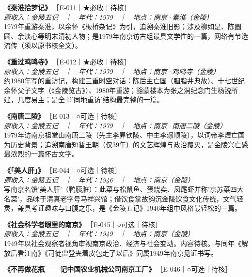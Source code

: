 \documentclass[UTF8,fontset=none,zihao=-4,a4paper]{ctexart}
\newcommand{\fb}{\CJKfamily{zhfb}}
\begin{document}
\noindent\textbf{《秦淮拾梦记》}\,{\small ［E-011｜★必收｜待核］}\\
{\small\itshape 原收入：金陵五记　｜　年代：1979　｜　地点：南京·秦淮（金陵）}\\
1979年重游秦淮，以余怀《板桥杂记》为引，追溯秦淮旧影；涉及柳如是、陈圆圆、余淡心等明末清初人物；是1979年南京访古组最具文学性的一篇，网络有节选流传（须以原书核全文）。
\par\vspace{5pt}
\noindent\textbf{《重过鸡鸣寺》}\,{\small ［E-012｜★必收｜待核］}\\
{\small\itshape 原收入：金陵五记　｜　年代：1979　｜　地点：南京·鸡鸣寺（金陵）}\\
约1980年写的重访记，构建三重时空对话：陈后主亡国（胭脂井典故）、十七世纪余怀父子文字（《金陵览古》）、1980年重游；豁蒙楼本为张之洞纪念门生杨锐所建，几度易主；是全书'同地重访'结构最完整的一篇。
\par\vspace{5pt}
\noindent\textbf{《南唐二陵》}\,{\small ［E-013｜○可选｜待核］}\\
{\small\itshape 原收入：金陵五记　｜　年代：1979　｜　地点：南京·南唐二陵（金陵）}\\
1979年访南京祖堂山南唐二陵（先主李{\fb 昪}钦陵、中主李{\fb 璟}顺陵），以词帝李煜亡国为历史背景；追溯南唐短暂王朝（仅39年）的文艺辉煌与政治覆灭，是金陵兴亡感最浓烈的一篇怀古文字。
\par\vspace{5pt}
\noindent\textbf{《「美人肝」》}\,{\small ［E-044｜○可选｜待核］}\\
{\small\itshape 原收入：金陵五记　｜　年代：1946　｜　地点：南京（金陵）}\\
写南京名馔'美人肝'（鸭胰脏）：此菜与松鼠鱼、蛋烧卖、凤尾虾并称'京苏菜四大名菜'，品味于清真老字号马祥兴馆；借饮食掌故钩沉金陵饮食文化传统，文气轻灵，兼具考证趣味与口腹之乐，是《金陵五记》1946年组中风格最轻松的一篇。
\par\vspace{5pt}
\noindent\textbf{《社会科学者眼里的南京》}\,{\small ［E-045｜○可选｜待核］}\\
{\small\itshape 原收入：金陵五记　｜　年代：1949　｜　地点：南京（金陵）}\\
1949年以社会观察者视角审视南京政治、经济与社会变动。内容待核。与同年《解放后看江南》《司徒雷登夹着皮包走了以后》同属1949年南京见证书写。
\par\vspace{5pt}
\noindent\textbf{《不再做花瓶——记中国农业机械公司南京工厂》}\,{\small ［E-046｜○可选｜待核］}\\
\end{document}
